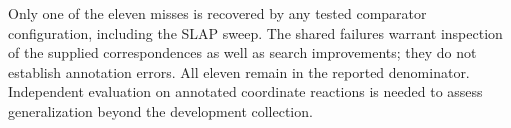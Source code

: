 Only one of the eleven misses is recovered by any tested comparator configuration, including the SLAP sweep. The shared failures warrant inspection of the supplied correspondences as well as search improvements; they do not establish annotation errors. All eleven remain in the reported denominator. Independent evaluation on annotated coordinate reactions is needed to assess generalization beyond the development collection.
